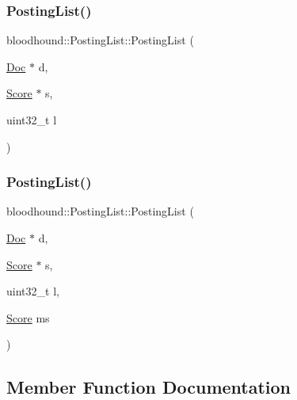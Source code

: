\subsubsection{\texorpdfstring{Posting\+List()}{PostingList()}\hspace{0.1cm}{\footnotesize\ttfamily [1/2]}}
{\footnotesize\ttfamily bloodhound\+::\+Posting\+List\+::\+Posting\+List (\begin{DoxyParamCaption}\item[{\hyperlink{structbloodhound_1_1Doc}{Doc} $\ast$}]{d,  }\item[{\hyperlink{structbloodhound_1_1Score}{Score} $\ast$}]{s,  }\item[{uint32\+\_\+t}]{l }\end{DoxyParamCaption})\hspace{0.3cm}{\ttfamily [inline]}}

\mbox{\label{classbloodhound_1_1PostingList_a725f1df76c8278f1d927fff3ed4c496e}} 
\subsubsection{\texorpdfstring{Posting\+List()}{PostingList()}\hspace{0.1cm}{\footnotesize\ttfamily [2/2]}}
{\footnotesize\ttfamily bloodhound\+::\+Posting\+List\+::\+Posting\+List (\begin{DoxyParamCaption}\item[{\hyperlink{structbloodhound_1_1Doc}{Doc} $\ast$}]{d,  }\item[{\hyperlink{structbloodhound_1_1Score}{Score} $\ast$}]{s,  }\item[{uint32\+\_\+t}]{l,  }\item[{\hyperlink{structbloodhound_1_1Score}{Score}}]{ms }\end{DoxyParamCaption})\hspace{0.3cm}{\ttfamily [inline]}}



\subsection{Member Function Documentation}
\mbox{\label{classbloodhound_1_1PostingList_a274f57f133cd6763e0d8cc3e00fa1be3}} 

